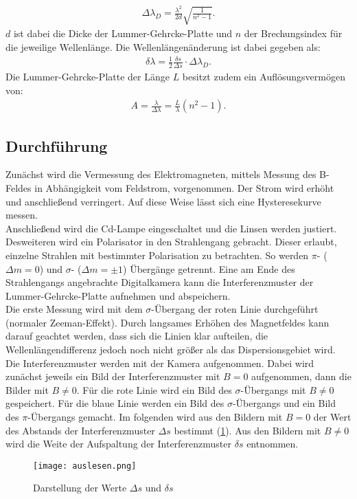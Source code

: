 \begin{align}
	\Delta \lambda_D =\frac{\lambda^2}{2d}\sqrt{\frac{1}{n^2-1}}.
	\label{eqn:dispersionsgebiet}
\end{align}
$d$ ist dabei die Dicke der Lummer-Gehrcke-Platte und $n$ der Brechungsindex für die jeweilige Wellenlänge.
Die Wellenlängenänderung ist dabei gegeben als:
\begin{align}
  \delta \lambda = \frac{1}{2}\frac{\delta s}{\Delta s}\cdot \Delta\lambda_D.
	\label{eqn:wellenlänge}
\end{align}
Die Lummer-Gehrcke-Platte der Länge $L$ besitzt zudem ein Auflösungsvermögen von:
\begin{align}
 A=\frac{\lambda}{\Delta\lambda}=\frac{L}{\lambda}(n^2-1).
 \label{eqn:auflösung}
\end{align}
\FloatBarrier


\subsection{Durchführung}
Zunächst wird die Vermessung des Elektromagneten, mittels Messung des B-Feldes in Abhängigkeit vom Feldstrom, vorgenommen.
Der Strom wird erhöht und anschließend verringert.
Auf diese Weise lässt sich eine Hysteresekurve messen.\\
Anschließend wird die Cd-Lampe eingeschaltet und die Linsen werden justiert.
Desweiteren wird ein Polarisator in den Strahlengang gebracht.
Dieser erlaubt, einzelne Strahlen mit bestimmter Polarisation zu betrachten.
So werden $\pi$- ($\Delta m = 0$) und $\sigma$- ($\Delta m = \pm 1$) Übergänge getrennt.
Eine am Ende des Strahlengangs angebrachte Digitalkamera kann die Interferenzmuster der Lummer-Gehrcke-Platte aufnehmen und abspeichern.\\
%
Die erste Messung wird mit dem $\sigma$-Übergang der roten Linie durchgeführt (normaler Zeeman-Effekt).
Durch langsames Erhöhen des Magnetfeldes kann darauf geachtet werden, dass sich die Linien klar aufteilen, die Wellenlängendifferenz jedoch noch nicht größer als das Dispersionsgebiet wird.
Die Interferenzmuster werden mit der Kamera aufgenommen.
Dabei wird zunächst jeweils ein Bild der Interferenzmuster mit $B=0$ aufgenommen, dann die Bilder mit $B≠0$.
Für die rote Linie wird ein Bild des $\sigma$-Übergangs mit $B≠0$ gespeichert.
Für die blaue Linie werden ein Bild des $\sigma$-Übergangs und ein Bild des $\pi$-Übergangs gemacht.
Im folgenden wird aus den Bildern mit $B=0$ der Wert des Abstands der Interferenzmuster $\Delta s$ bestimmt (\ref{fig:auslesen}).
Aus den Bildern mit $B≠0$ wird die Weite der Aufspaltung der Interferenzmuster $\delta s$ entnommen.
\begin{figure}[h!]
  \centering
  \texttt{[image: auslesen.png]}
  \caption{Darstellung der Werte $\Delta s$ und $\delta s$ \cite{1}}
  \label{fig:auslesen}
\end{figure}

\FloatBarrier
